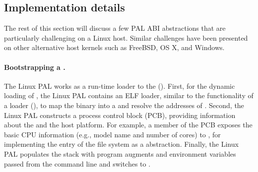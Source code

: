 

\subsection{Implementation details}

The rest of this section
will discuss a few PAL ABI abstractions that are particularly challenging on a Linux host.
Similar challenges have been presented %
on other alternative host kernels such as FreeBSD, OS X, and Windows.


\paragraph{Bootstrapping a \picoproc{}.}
The Linux PAL works as a run-time loader to the \graphene{} \libos{} (\thelibos{}). %
First, for the dynamic loading of \thelibos{},
the Linux PAL contains an ELF loader, similar to the functionality of a \libc{} loader (),
to map the \thelibos{} binary into a \picoproc{} and resolve the addresses of \hostapis{}.
Second, the Linux PAL constructs a process control block (PCB),
providing information
about the \picoproc{} and the host platform.
For example, a member of the PCB exposes the basic CPU information (e.g., model name and number of cores) to \thelibos{}, 
for implementing the  entry of the  file system
as a \libos{} abstraction.
Finally,
the Linux PAL populates the stack with program augments and environment variables passed from the command line and switches to \thelibos{}.




